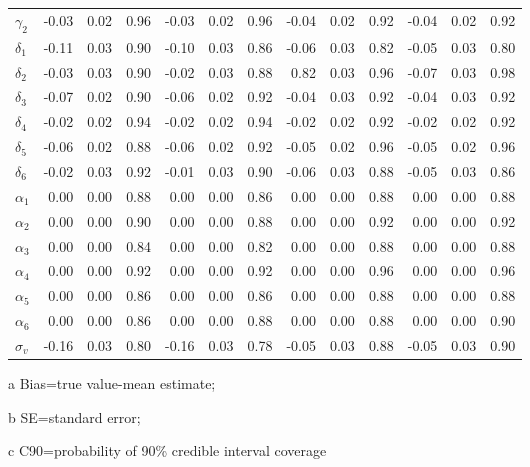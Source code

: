 \begin{center}
\begin{table}[H]
\begin{threeparttable}
\begin{tabular}{lrllrllrllrll}
  $\gamma_2$ & -0.03 & 0.02 & 0.96 & -0.03 & 0.02 & 0.96 & -0.04 & 0.02 & 0.92& -0.04 & 0.02 & 0.92\\
  $\delta_1$ & -0.11 & 0.03 & 0.90 & -0.10 & 0.03 & 0.86 & -0.06 & 0.03 & 0.82 & -0.05 & 0.03 & 0.80\\
  $\delta_2$ & -0.03 & 0.03 & 0.90 & -0.02 & 0.03 & 0.88 & 0.82 & 0.03 & 0.96 & -0.07 & 0.03 & 0.98\\
  $\delta_3$ & -0.07 & 0.02 & 0.90 & -0.06 & 0.02 & 0.92 & -0.04 & 0.03 & 0.92 & -0.04 & 0.03 & 0.92\\
  $\delta_4$ & -0.02 & 0.02 & 0.94 & -0.02 & 0.02 & 0.94 & -0.02 & 0.02 & 0.92 & -0.02 & 0.02 & 0.92\\
  $\delta_5$ & -0.06 & 0.02 & 0.88 & -0.06 & 0.02 & 0.92 & -0.05 & 0.02 & 0.96 & -0.05 & 0.02 & 0.96\\
  $\delta_6$ & -0.02 & 0.03 & 0.92 & -0.01 & 0.03 & 0.90 & -0.06 & 0.03 & 0.88 & -0.05 & 0.03 & 0.86\\
  $\alpha_1$ & 0.00 & 0.00 & 0.88 & 0.00 & 0.00 & 0.86 & 0.00 & 0.00 & 0.88 & 0.00 & 0.00 & 0.88\\
  $\alpha_2$ & 0.00 & 0.00 & 0.90 & 0.00 & 0.00 & 0.88 & 0.00 & 0.00 & 0.92 & 0.00 & 0.00 & 0.92\\
  $\alpha_3$ & 0.00 & 0.00 & 0.84 & 0.00 & 0.00 & 0.82 & 0.00 & 0.00 & 0.88 & 0.00 & 0.00 & 0.88\\
  $\alpha_4$ & 0.00 & 0.00 & 0.92 & 0.00 & 0.00 & 0.92 & 0.00 & 0.00 & 0.96 & 0.00 & 0.00 & 0.96\\
  $\alpha_5$ & 0.00 & 0.00 & 0.86 & 0.00 & 0.00 & 0.86 & 0.00 & 0.00 & 0.88 & 0.00 & 0.00 & 0.88\\
  $\alpha_6$ & 0.00 & 0.00 & 0.86 & 0.00 & 0.00 & 0.88 & 0.00 & 0.00 & 0.88 & 0.00 & 0.00 & 0.90\\
  $\sigma_v$ & -0.16 & 0.03 & 0.80 & -0.16 & 0.03 & 0.78 & -0.05 & 0.03 & 0.88 & -0.05 & 0.03 & 0.90\\
    \bottomrule
  \end{tabular}
   \begin{tablenotes}[para]
    \footnotesize
        \item[a] Bias=true value-mean estimate; \item[b] SE=standard error; \item[c] C90=probability of 90\% credible interval coverage 
    \end{tablenotes}
    \end{threeparttable}
\end {table}
\end{center}

